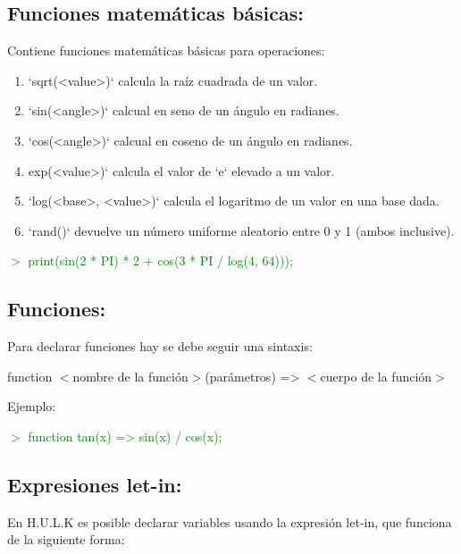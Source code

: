 \documentclass[a4paper,12pt]{article}
\begin{document}
    \subsection{Funciones matemáticas básicas:}\label{sub:mathExpressions}
    \begin{flushleft}
        Contiene funciones matemáticas básicas para operaciones:
        
        \begin{enumerate}
            \item `sqrt(<value>)` calcula la raíz cuadrada de un valor.
            \item `sin(<angle>)` calcual en seno de un ángulo en radianes.
            \item `cos(<angle>)` calcual en coseno de un ángulo en radianes.
            \item exp(<value>)` calcula el valor de `e` elevado a un valor.
            \item `log(<base>, <value>)` calcula el logaritmo de un valor en una base dada.
            \item `rand()` devuelve un número uniforme aleatorio entre 0 y 1 (ambos inclusive).
        \end{enumerate}
    \end{flushleft}

    \textcolor{green}{$>$ print(sin(2 * PI) * 2 + cos(3 * PI / log(4, 64)));}
    
    \subsection{Funciones:}\label{sub:functions}
    \begin{flushleft}
        Para declarar funciones hay se debe seguir una sintaxis:

        function $<$nombre de la función$>$(parámetros) =>  $<$cuerpo de la función$>$

    \end{flushleft}
    Ejemplo:

    \textcolor{green}{$>$ function tan(x) => sin(x) / cos(x);}

    \newpage

    \subsection{Expresiones let-in:}\label{sub:letin}
    \begin{flushleft}
        En H.U.L.K es posible declarar variables usando la expresión let-in, que funciona de la siguiente forma:
    \end{flushleft}
\end{document}
